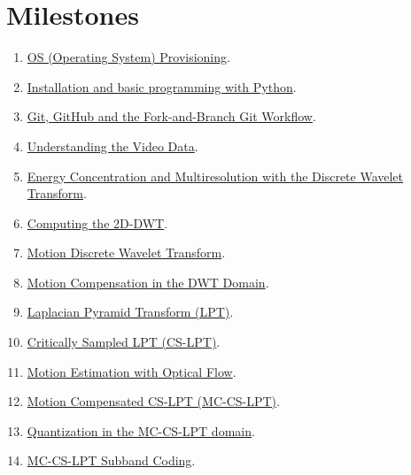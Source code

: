 \section{Milestones}
\begin{enumerate}
\item \href{https://sistemas-multimedia.github.io/study_guide/01-provisioning/}{OS (Operating System) Provisioning}.
\item \href{https://sistemas-multimedia.github.io/study_guide/02-python/}{Installation and basic programming with Python}.
\item \href{https://sistemas-multimedia.github.io/study_guide/03-git/}{Git, GitHub and the Fork-and-Branch Git Workflow}.
\item \href{https://sistemas-multimedia.github.io/study_guide/04-the_data/}{Understanding the Video Data}.
\item \href{https://sistemas-multimedia.github.io/study_guide/05-DWT/}{Energy Concentration and Multiresolution with the Discrete Wavelet Transform}.
\item \href{https://sistemas-multimedia.github.io/study_guide/06-2D-DWT/}{Computing the 2D-DWT}.
\item \href{https://sistemas-multimedia.github.io/study_guide/07-MDWT/}{Motion Discrete Wavelet Transform}.
\item \href{https://sistemas-multimedia.github.io/study_guide/08-MC_in_DWT_domain/}{Motion Compensation in the DWT Domain}.
\item \href{https://sistemas-multimedia.github.io/study_guide/09-LPT/}{Laplacian Pyramid Transform (LPT)}.
\item \href{https://sistemas-multimedia.github.io/study_guide/10-CS-LPT/}{Critically Sampled LPT (CS-LPT)}.
\item \href{https://sistemas-multimedia.github.io/study_guide/11-OF/}{Motion Estimation with Optical Flow}.
\item \href{https://sistemas-multimedia.github.io/study_guide/12-MC-CS-LPT/}{Motion Compensated CS-LPT (MC-CS-LPT)}.
\item \href{https://sistemas-multimedia.github.io/study_guide/13-quantization/}{Quantization in the MC-CS-LPT domain}.
\item \href{https://sistemas-multimedia.github.io/study_guide/14-coding/}{MC-CS-LPT Subband Coding}.
\end{enumerate}

